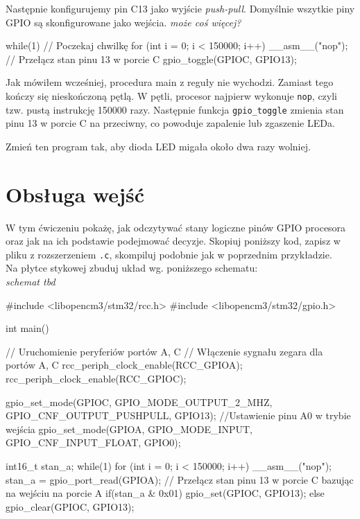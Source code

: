 \documentclass{pdfBooklets}
\begin{document}
Następnie konfigurujemy pin C13 jako wyjście \textit{push-pull}. Domyślnie wszytkie piny GPIO są skonfigurowane jako wejścia.
\textit{może coś więcej?}


\begin{CodeFrame*}[c]{}
  while(1){
    // Poczekaj chwilkę
    for (int i = 0; i < 150000; i++) __asm__("nop");
    // Przełącz stan pinu 13 w porcie C
    gpio_toggle(GPIOC, GPIO13); 
  }
\end{CodeFrame*}

Jak mówiłem wcześniej, procedura main z reguły nie wychodzi. Zamiast tego kończy się nieskończoną pętlą. W pętli, procesor najpierw
wykonuje \texttt{nop}, czyli tzw. pustą instrukcję 150000 razy\footnotemark. Następnie funkcja \Verb$gpio_toggle$ zmienia stan pinu 13
w porcie C na przeciwny, co powoduje zapalenie lub zgaszenie LEDa.

\begin{Zadanie}{}{}
  Zmień ten program tak, aby dioda LED migała około dwa razy wolniej.
\end{Zadanie}



\section{Obsługa wejść}
W tym ćwiczeniu pokażę, jak odczytywać stany logiczne pinów GPIO procesora oraz jak na ich podstawie podejmować
decyzje. Skopiuj poniższy kod, zapisz w pliku z rozszerzeniem \Verb$.c$, skompiluj podobnie jak w poprzednim przykładzie.
\\

Na płytce stykowej zbuduj układ wg. poniższego schematu:
\\

\textit{schemat tbd}


\begin{CodeFrame*}[c]{}
#include <libopencm3/stm32/rcc.h>
#include <libopencm3/stm32/gpio.h>

int main(){
  // Uruchomienie peryferiów portów A, C
  // Włączenie sygnału zegara dla portów A, C
  rcc_periph_clock_enable(RCC_GPIOA);
  rcc_periph_clock_enable(RCC_GPIOC);

  gpio_set_mode(GPIOC, GPIO_MODE_OUTPUT_2_MHZ,
		GPIO_CNF_OUTPUT_PUSHPULL, GPIO13);
  //Ustawienie pinu A0 w trybie wejścia
  gpio_set_mode(GPIOA, GPIO_MODE_INPUT,
		GPIO_CNF_INPUT_FLOAT, GPIO0);

  int16_t stan_a;
  while(1){
    for (int i = 0; i < 150000; i++) __asm__("nop");
    stan_a = gpio_port_read(GPIOA);
    // Przełącz stan pinu 13 w porcie C bazując na wejściu na porcie A
    if(stan_a & 0x01){
      gpio_set(GPIOC, GPIO13);
    }else{
      gpio_clear(GPIOC, GPIO13);
    }
  }
}
\end{CodeFrame*}
\end{document}
